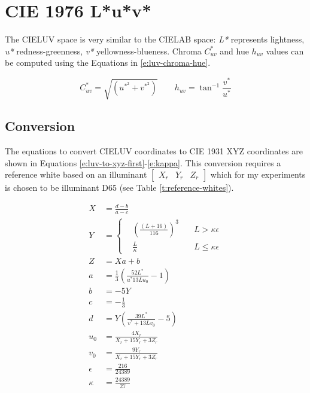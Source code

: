 \section{CIE 1976 L*u*v*}
\label{s:luv}

The CIELUV space is very similar to the CIELAB space: \emph{L*}
represents lightness, \emph{u*} redness-greenness, \emph{v*}
yellowness-blueness. Chroma $C^*_{uv}$ and hue $h_{uv}$ values can be
computed using the Equations in \ref{e:luv-chroma-hue}.

\begin{equation}
C^*_{uv} = \sqrt{\left(u^{*^2} + v^{*^2} \right)} \qquad h_{uv} = \tan^{-1} \frac{v^*}{u^*}
\label{e:luv-chroma-hue}
\end{equation}

\subsection{Conversion}

The equations to convert CIELUV coordinates to CIE 1931 XYZ
coordinates are shown in Equations
\ref{e:luv-to-xyz-first}-\ref{e:kappa}. This conversion requires a
reference white based on an illuminant $\begin{bmatrix}X_r & Y_r &
  Z_r\end{bmatrix}$ which for my experiments is chosen to be
illuminant D65 (see Table \ref{t:reference-whites}).

\begin{align}
X& = \frac{d - b}{a - c} 
\label{e:luv-to-xyz-first} \\
Y& = 
\left\{
\begin{aligned}
&\left(\frac{(L + 16)}{116}\right)^3& \quad L > \kappa\epsilon \\
&\frac{L}{\kappa}& \quad L \leq \kappa\epsilon
\end{aligned} 
\right. \\
Z& = Xa + b \\
a& = \frac{1}{3}\left(\frac{52L^{*}}{u^{*}13Lu_0}-1\right) \\
b& = -5Y  \\
c& = -\frac{1}{3} \\
d& = Y \left(\frac{39L^{*}}{v^{*}+13Lv_0} - 5\right) \\
u_0& = \frac{4X_r}{X_r + 15Y_r + 3 Z_r}  \\
v_0& = \frac{9Y_r}{X_r + 15Y_r + 3 Z_r}  \\
\epsilon& = \frac{216}{24389} 
\label{e:epsilon} \\
\kappa& = \frac{24389}{27}
\label{e:kappa}
\end{align}

